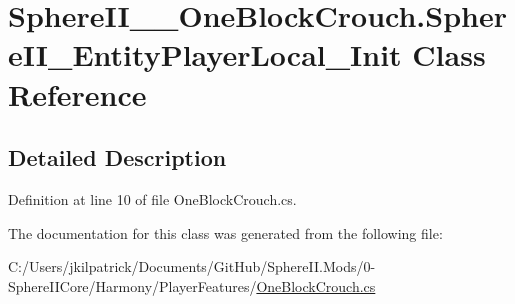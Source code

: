 \hypertarget{class_sphere_i_i_____one_block_crouch_1_1_sphere_i_i___entity_player_local___init}{}\section{Sphere\+I\+I\+\_\+\+\_\+\+One\+Block\+Crouch.\+Sphere\+I\+I\+\_\+\+Entity\+Player\+Local\+\_\+\+Init Class Reference}
\label{class_sphere_i_i_____one_block_crouch_1_1_sphere_i_i___entity_player_local___init}


\subsection{Detailed Description}


Definition at line 10 of file One\+Block\+Crouch.\+cs.



The documentation for this class was generated from the following file\+:\begin{DoxyCompactItemize}
\item 
C\+:/\+Users/jkilpatrick/\+Documents/\+Git\+Hub/\+Sphere\+I\+I.\+Mods/0-\/\+Sphere\+I\+I\+Core/\+Harmony/\+Player\+Features/\mbox{\hyperlink{_one_block_crouch_8cs}{One\+Block\+Crouch.\+cs}}\end{DoxyCompactItemize}
